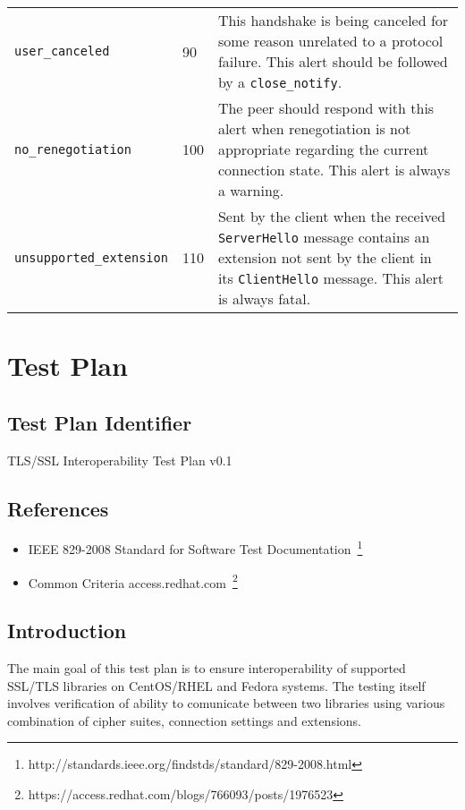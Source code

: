 \begin{tabularx}{\linewidth}{@{}l l X}
    \texttt{user\_canceled}               & 90  & This handshake is being canceled for some reason unrelated to a protocol failure. This alert should be followed
                                                  by a \texttt{close\_notify}. \\
    \texttt{no\_renegotiation}            & 100 & The peer should respond with this alert when renegotiation is not appropriate regarding the current connection
                                                  state. This alert is always a warning. \\
    \texttt{unsupported\_extension}       & 110 & Sent by the client when the received \texttt{ServerHello} message contains an extension not sent by the client
                                                  in its \texttt{ClientHello} message. This alert is always fatal.
    \end{tabularx}


\chapter{Test Plan}
\section{Test Plan Identifier}
    TLS/SSL Interoperability Test Plan v0.1

\section{References}
    \begin{itemize}
        \item IEEE 829-2008 Standard for Software Test
        Documentation~\footnote{http://standards.ieee.org/findstds/standard/829-2008.html}
        \item Common Criteria \@ access.redhat.com~\footnote{https://access.redhat.com/blogs/766093/posts/1976523}
    \end{itemize}

\section{Introduction}
    The main goal of this test plan is to ensure interoperability of supported
    SSL/TLS libraries on CentOS/RHEL and Fedora systems. The testing itself involves
    verification of ability to comunicate between two libraries using various
    combination of cipher suites, connection settings and extensions.


